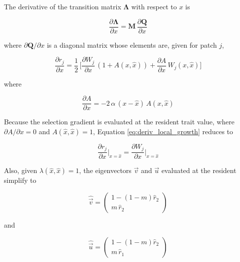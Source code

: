 The derivative of the transition matrix $\pmb\Lambda$ with respect to $x$ is

\begin{equation}
    \frac{\partial \pmb{\Lambda}}{\partial x} = \pmb{M} \, \frac{\partial \pmb{Q}}{\partial x}
\end{equation}

where $\partial \pmb{Q} / \partial x$ is a diagonal matrix whose elements are, given for patch $j$,

\begin{equation}
    \frac{\partial r_j}{\partial x} = \frac{1}{2} \, \bigg[\frac{\partial W_j}{\partial x} \, (1 + A(x, \hat{x})) + \frac{\partial A}{\partial x} \, W_j(x, \hat{x})\bigg]
    \label{eq:deriv_local_growth}
\end{equation}

where

\begin{equation}
    \frac{\partial A}{\partial x} = -2 \, \alpha \, (x - \hat{x}) \, A(x, \hat{x})
\end{equation}

Because the selection gradient is evaluated at the resident trait value, where $\partial A / \partial x = 0$ and $A(\hat{x},\hat{x}) = 1$, Equation \ref{eq:deriv_local_growth} reduces to

\begin{equation}
    \frac{\partial r_j}{\partial x}\bigg|_{x=\hat{x}} = \frac{\partial W_j}{\partial x}\bigg|_{x=\hat{x}} 
\end{equation}

Also, given $\lambda(\hat{x}, \hat{x}) = 1$, the eigenvectors $\overrightarrow{v}$ and $\overrightarrow{u}$ evaluated at the resident simplify to

\begin{equation}
    \hat{\overrightarrow{v}} = 
    \begin{pmatrix}
        1 - (1-m)\hat{r}_2\\
        m \, \hat{r}_2
    \end{pmatrix}
    \label{eq:left_eigenvector_resident}
\end{equation}

and

\begin{equation}
    \hat{\overrightarrow{u}} = 
    \begin{pmatrix}
        1 - (1-m)\hat{r}_2\\
        m \, \hat{r}_1
    \end{pmatrix}
    \label{eq:right_eigenvector_resident}
\end{equation}

